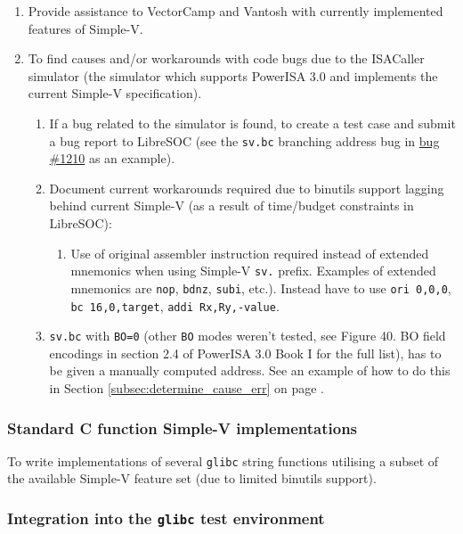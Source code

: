 \begin{enumerate}
  \item Provide assistance to VectorCamp and Vantosh with currently implemented
features of Simple-V.
  \item To find causes and/or workarounds with code bugs due to the ISACaller
simulator (the simulator which supports PowerISA 3.0 and implements the current
Simple-V specification).
  \begin{enumerate}
    \item If a bug related to the simulator is found, to create a test
  case and submit a bug report to LibreSOC (see the \texttt{sv.bc} branching address
  bug in \href{https://bugs.libre-soc.org/show_bug.cgi?id=1210}{bug \#1210}
  as an example).
    \item Document current workarounds required due to binutils support lagging
  behind current Simple-V (as a result of time/budget constraints in LibreSOC):
    \begin{enumerate}
      \item  Use of original assembler instruction required instead of
      extended mnemonics when using Simple-V \texttt{sv.} prefix.
      Examples of extended mnemonics are \texttt{nop}, \texttt{bdnz},
      \texttt{subi}, etc.). Instead have to use
      \texttt{ori 0,0,0}, \texttt{bc 16,0,target}, \texttt{addi Rx,Ry,-value}.
    \end{enumerate}
    \item \texttt{sv.bc} with \texttt{BO=0} (other \texttt{BO} modes weren't tested, see
  Figure 40. BO field encodings in section 2.4 of PowerISA 3.0 Book I
  for the full list), has to be given a manually computed address.
  See an example of how to do this in Section \ref{subsec:determine_cause_err}
  on page \pageref{subsec:determine_cause_err}.
  \end{enumerate}
\end{enumerate}

\subsubsection{Standard C function Simple-V implementations}

To write implementations of several \texttt{glibc} string functions utilising a subset
of the available Simple-V feature set (due to limited binutils support).

\subsubsection{Integration into the \texttt{glibc} test environment}


